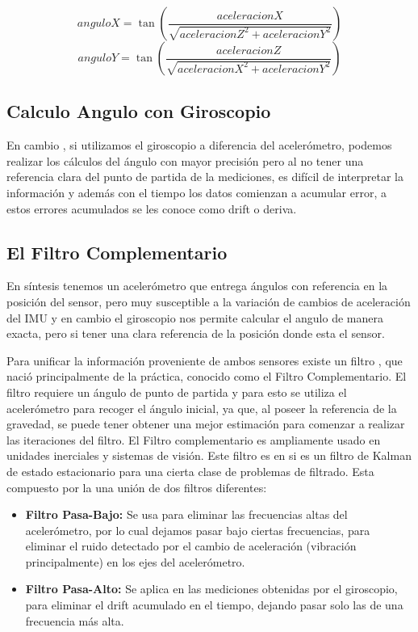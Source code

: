 \documentclass[12pt,a4paper]{article}
\begin{document}
\begin{figure}[H]
\begin{equation}
anguloX = \tan{\left(\frac{aceleracionX}{\sqrt{aceleracionZ^{2}+aceleracionY^{2}}}\right)}
\label{eq:calculoanguloXsensorvertical}
\end{equation}
\begin{equation}
anguloY = \tan{\left(\frac{aceleracionZ}{\sqrt{aceleracionX^{2}+aceleracionY^{2}}}\right)}
\label{eq:calculoanguloYsensorvertical}
\end{equation}
\end{figure}

\subsection{Calculo Angulo con Giroscopio} 
En cambio , si utilizamos el giroscopio a diferencia del acelerómetro, podemos realizar los cálculos del ángulo con mayor precisión pero al no tener una referencia clara del punto de partida de la mediciones, es difícil de interpretar la información y además con el tiempo los datos comienzan a acumular error, a estos errores acumulados se les conoce como drift o deriva.

\subsection{El Filtro Complementario}

En síntesis tenemos un acelerómetro que entrega ángulos con referencia en la posición del sensor, pero muy susceptible a la variación de cambios de aceleración del IMU y en cambio el giroscopio nos permite calcular el angulo de manera exacta, pero si tener una clara referencia de la posición donde esta el sensor. 

Para unificar la información proveniente de ambos sensores existe un filtro , que nació principalmente de la práctica, conocido como el Filtro Complementario.
El filtro requiere un ángulo de punto de partida y para esto se utiliza el acelerómetro para recoger el ángulo inicial, ya que, al poseer la referencia de la gravedad, se puede tener obtener una mejor estimación para comenzar a realizar las iteraciones del filtro.
\newline
El Filtro complementario es ampliamente usado en unidades inerciales y sistemas de visión. Este filtro es en si es un filtro de Kalman de estado estacionario para una cierta clase de problemas de filtrado.
Esta compuesto por la una unión de dos filtros diferentes:
\begin{itemize}
\item \textbf{Filtro Pasa-Bajo:} Se usa para eliminar las frecuencias altas del acelerómetro, por lo cual dejamos pasar bajo ciertas frecuencias, para eliminar el ruido detectado por el cambio de aceleración (vibración principalmente) en los ejes del acelerómetro.
\item \textbf{Filtro Pasa-Alto:} Se aplica en las mediciones obtenidas por el giroscopio, para eliminar el drift acumulado en el tiempo, dejando pasar solo las de una frecuencia más alta.
\end{itemize}
\end{document}
